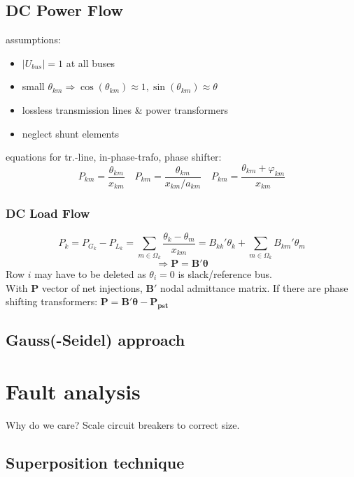 \documentclass[a4paper,10pt,landscape]{scrartcl}
\begin{document}
\begin{multicols*}{3}
\subsection{DC Power Flow}
assumptions:
\begin{itemize}
    \item $|U_{bus}|=1$ at all buses
    \item small $\theta_{km}\Rightarrow \cos(\theta_{km})\approx1, \sin(\theta_{km})\approx \theta$
    \item lossless transmission lines \& power transformers
    \item neglect shunt elements
\end{itemize}
equations for tr.-line, in-phase-trafo, phase shifter:
$$P_{km}=\frac{\theta_{km}}{x_{km}} \quad P_{km}=\frac{\theta_{km}}{x_{km}/a_{km}} \quad P_{km}=\frac{\theta_{km}+\varphi_{km}}{x_{km}}$$
\subsubsection{DC Load Flow}
$$P_k=P_{G_{k}}-P_{L_{k}} = \underset{m\in\Omega_k}{\sum}\frac{\theta_k-\theta_m}{x_{km}}=B_{kk}'\theta_k + \underset{m\in\Omega_k}{\sum}B_{km}'\theta_m$$
$$\Rightarrow \mathbf{P=B'\theta}$$
Row $i$ may have to be deleted as $\theta_i=0$ is slack/reference bus. \\
With $\mathbf{P}$ vector of net injections, $\mathbf{B'}$ nodal admittance matrix. If there are phase shifting transformers: $\mathbf{P=B'\theta-P_{pst}}$

\subsection{Gauss(-Seidel) approach}







\section{Fault analysis}
Why do we care? Scale circuit breakers to correct size.

\subsection{Superposition technique}


\end{multicols*}
\end{document}
